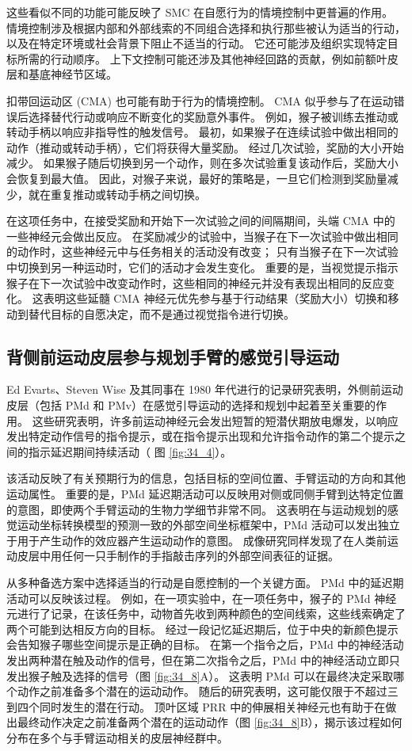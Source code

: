 这些看似不同的功能可能反映了 SMC 在自愿行为的情境控制中更普遍的作用。 情境控制涉及根据内部和外部线索的不同组合选择和执行那些被认为适当的行动，以及在特定环境或社会背景下阻止不适当的行动。 它还可能涉及组织实现特定目标所需的行动顺序。 上下文控制可能还涉及其他神经回路的贡献，例如前额叶皮层和基底神经节区域。

扣带回运动区 (CMA) 也可能有助于行为的情境控制。 CMA 似乎参与了在运动错误后选择替代行动或响应不断变化的奖励意外事件。 例如，猴子被训练去推动或转动手柄以响应非指导性的触发信号。 最初，如果猴子在连续试验中做出相同的动作（推动或转动手柄），它们将获得大量奖励。 经过几次试验，奖励的大小开始减少。 如果猴子随后切换到另一个动作，则在多次试验重复该动作后，奖励大小会恢复到最大值。 因此，对猴子来说，最好的策略是，一旦它们检测到奖励量减少，就在重复推动或转动手柄之间切换。

在这项任务中，在接受奖励和开始下一次试验之间的间隔期间，头端 CMA 中的一些神经元会做出反应。 在奖励减少的试验中，当猴子在下一次试验中做出相同的动作时，这些神经元中与任务相关的活动没有改变； 只有当猴子在下一次试验中切换到另一种运动时，它们的活动才会发生变化。 重要的是，当视觉提示指示猴子在下一次试验中改变动作时，这些相同的神经元并没有表现出相同的反应变化。 这表明这些延髓 CMA 神经元优先参与基于行动结果（奖励大小）切换和移动到替代目标的自愿决定，而不是通过视觉指令进行切换。


\subsection{背侧前运动皮层参与规划手臂的感觉引导运动}
Ed Evarts、Steven Wise 及其同事在 1980 年代进行的记录研究表明，外侧前运动皮层（包括 PMd 和 PMv）在感觉引导运动的选择和规划中起着至关重要的作用。 这些研究表明，许多前运动神经元会发出短暂的短潜伏期放电爆发，以响应发出特定动作信号的指令提示，或在指令提示出现和允许指令动作的第二个提示之间的指示延迟期间持续活动（ 图 \ref{fig:34_4}）。

该活动反映了有关预期行为的信息，包括目标的空间位置、手臂运动的方向和其他运动属性。 重要的是，PMd 延迟期活动可以反映用对侧或同侧手臂到达特定位置的意图，即使两个手臂运动的生物力学细节非常不同。 这表明在与运动规划的感觉运动坐标转换模型的预测一致的外部空间坐标框架中，PMd 活动可以发出独立于用于产生动作的效应器产生运动动作的意图。 成像研究同样发现了在人类前运动皮层中用任何一只手制作的手指敲击序列的外部空间表征的证据。

从多种备选方案中选择适当的行动是自愿控制的一个关键方面。 PMd 中的延迟期活动可以反映该过程。 例如，在一项实验中，在一项任务中，猴子的 PMd 神经元进行了记录，在该任务中，动物首先收到两种颜色的空间线索，这些线索确定了两个可能到达相反方向的目标。 经过一段记忆延迟期后，位于中央的新颜色提示会告知猴子哪些空间提示是正确的目标。 
在第一个指令之后，PMd 中的神经活动发出两种潜在触及动作的信号，但在第二次指令之后，PMd 中的神经活动立即只发出猴子触及选择的信号（图 \ref{fig:34_8}A）。 
这表明 PMd 可以在最终决定采取哪个动作之前准备多个潜在的运动动作。 
随后的研究表明，这可能仅限于不超过三到四个同时发生的潜在行动。 
顶叶区域 PRR 中的伸展相关神经元也有助于在做出最终动作决定之前准备两个潜在的运动动作（图 \ref{fig:34_8}B），揭示该过程如何分布在多个与手臂运动相关的皮层神经群中。

